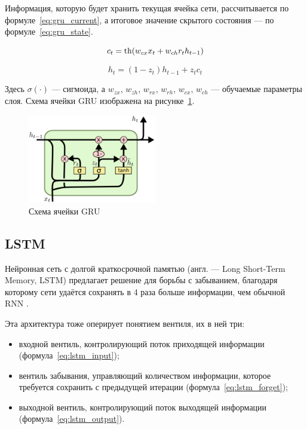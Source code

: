 Информация, которую будет хранить текущая ячейка сети, рассчитывается по формуле \ref*{eq:gru_current}, а итоговое значение скрытого состояния --- по формуле \ref*{eq:gru_state}.

\begin{equation}
    \label{eq:gru_current}
    c_t = \operatorname{th}(w_{cx}x_t+w_{ch}r_th_{t-1})
\end{equation}

\begin{equation}
    \label{eq:gru_state}
    h_t = (1-z_t)h_{t-1}+z_tc_t
\end{equation}

Здесь $\sigma(\cdot)$ --- сигмоида, а $w_{zx}$, $w_{zh}$, $w_{rx}$, $w_{rh}$, $w_{cx}$, $w_{ch}$ --- обучаемые параметры слоя.
Схема ячейки GRU изображена на рисунке \ref*{fig:gru}.

\begin{figure}[h]
    \centering
    \includegraphics[width=0.5\textwidth]{../inc/images/gru.png}
    \caption{Схема ячейки GRU}
    \label{fig:gru}
\end{figure}

\subsection{LSTM}

Нейронная сеть с долгой краткосрочной памятью (англ. --- Long Short-Term Memory, LSTM) предлагает решение для борьбы с забыванием, благодаря которому сети удаётся сохранять в 4 раза больше информации, чем обычной RNN \cite{art:rnn}.

Эта архитектура тоже оперирует понятием вентиля, их в ней три:
\begin{itemize}
    \item входной вентиль, контролирующий поток приходящей информации (формула \ref*{eq:lstm_input});
    \item вентиль забывания, управляющий количеством информации, которое требуется сохранить с предыдущей итерации (формула \ref*{eq:lstm_forget});
    \item выходной вентиль, контролирующий поток выходящей информации (формула \ref*{eq:lstm_output}).
\end{itemize}

